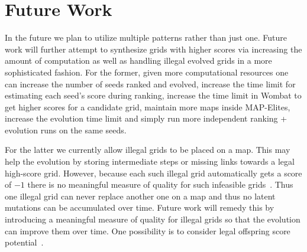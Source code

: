 \section{Future Work}

In the future we plan to utilize multiple patterns rather than just one.
Future work will further attempt to synthesize grids with higher scores via increasing the amount of computation as well as handling illegal evolved grids in a more sophisticated fashion. For the former, given more computational resources one can increase the number of seeds ranked and evolved, increase the time limit for estimating each seed's score during ranking, increase the time limit in {\sc Wombat} to get higher scores for a candidate grid, maintain more maps inside MAP-Elites, increase the evolution time limit and simply run more independent ranking + evolution runs on the same seeds. 

For the latter we currently allow illegal grids to be placed on a map. This may help the evolution by storing intermediate steps or missing links towards a legal high-score grid. However, because each such illegal grid automatically gets a score of $-1$ there is no meaningful measure of quality for such infeasible grids~\cite{FI2Pop}. Thus one illegal grid can never replace another one on a map and thus no latent mutations can be accumulated over time. Future work will remedy this by introducing a meaningful measure of quality for illegal grids so that the evolution can improve them over time. One possibility is to consider legal offspring score potential~\cite{Gallotta_2022}.